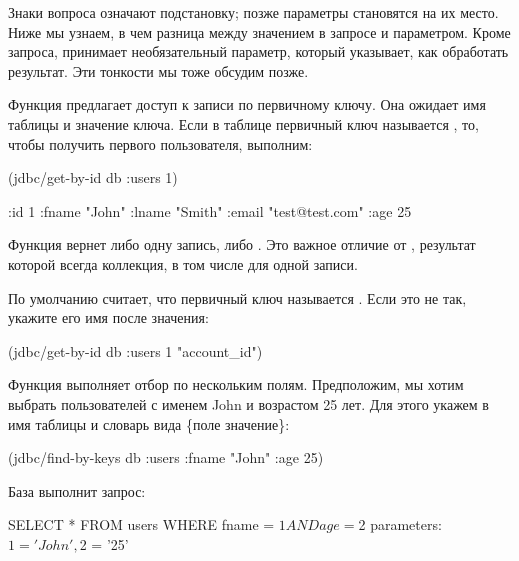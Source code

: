 Знаки вопроса означают подстановку; позже параметры становятся на их место. Ниже мы узнаем, в чем разница между значением в запросе и параметром. Кроме запроса,  принимает необязательный параметр, который указывает, как обработать результат. Эти тонкости мы тоже обсудим позже.

Функция  предлагает доступ к записи по первичному ключу. Она ожидает имя таблицы и значение ключа. Если в таблице  первичный ключ называется , то, чтобы получить первого пользователя, выполним:

\begin{english}
  \begin{clojure}
(jdbc/get-by-id db :users 1)

{:id 1 :fname "John" :lname "Smith"
 :email "test@test.com" :age 25}
  \end{clojure}
\end{english}

Функция вернет либо одну запись, либо . Это важное отличие от , результат которой всегда коллекция, в том числе для одной записи.

По умолчанию  считает, что первичный ключ называется . Если это не так, укажите  его имя после значения:

\begin{english}
  \begin{clojure}
(jdbc/get-by-id db :users 1 "account_id")
  \end{clojure}
\end{english}

Функция  выполняет отбор по нескольким полям. Предположим, мы хотим выбрать пользователей с именем John и возрастом 25 лет. Для этого укажем в  имя таблицы и словарь вида \{поле \arr значение\}:

\begin{english}
  \begin{clojure}
(jdbc/find-by-keys db :users {:fname "John" :age 25})
  \end{clojure}
\end{english}

База выполнит запрос:

\begin{english}
  \begin{sql}
SELECT * FROM users WHERE fname = $1 AND age = $2
parameters: $1 = 'John', $2 = '25'
  \end{sql}
\end{english}

